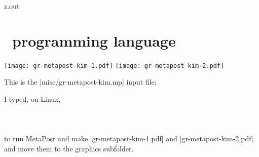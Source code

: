 \begin{VerbatimOut}{z.out}

\section{\protect\METAPOSTLogo\ programming language}
\todoindex{\METAPOSTLogo}

\todoindex{\MetaPostLogo}

\texttt{[image: gr-metapost-kim-1.pdf]}
\hspace*{0.1truein}
\texttt{[image: gr-metapost-kim-2.pdf]}

This is the |misc/gr-metapost-kim.mp| input file:

I typed, on Linux,\\
\hspace*{3\parindent}\\
\hspace*{3\parindent}\\
\hspace*{3\parindent}\\
to run MetaPost and make |gr-metapost-kim-1.pdf|
and |gr-metapost-kim-2.pdf|,
and move them to the graphics subfolder.
\end{VerbatimOut}

\MyIO


